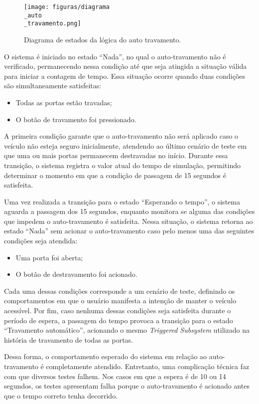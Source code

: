 \begin{figure}[H]
\centering
\texttt{[image: figuras/diagrama\\\_auto\\\_travamento.png]}
\caption{Diagrama de estados da lógica do auto travamento.}
\end{figure}

O sistema é iniciado no estado ``Nada'', no qual o auto-travamento não é verificado, permanecendo nessa condição até que seja atingida a situação válida para iniciar 
a contagem de tempo. Essa situação ocorre quando duas condições são simultaneamente satisfeitas:

\begin{itemize}
	\item Todas as portas estão travadas;
	\item O botão de travamento foi pressionado.
\end{itemize}

A primeira condição garante que o auto-travamento não será aplicado caso o veículo não esteja seguro inicialmente, atendendo ao último cenário de teste em que uma 
ou mais portas permanecem destravadas no início. Durante essa transição, o sistema registra o valor atual do tempo de simulação, permitindo determinar o momento em 
que a condição de passagem de 15 segundos é satisfeita.

Uma vez realizada a transição para o estado ``Esperando o tempo'', o sistema aguarda a passagem dos 15 segundos, enquanto monitora se alguma das condições que impedem 
o auto-travamento é satisfeita. Nessa situação, o sistema retorna ao estado ``Nada'' sem acionar o auto-travamento caso pelo menos uma das seguintes condições seja atendida:
\begin{itemize}
	\item Uma porta foi aberta;
	\item O botão de destravamento foi acionado.
\end{itemize}

Cada uma dessas condições corresponde a um cenário de teste, definindo os comportamentos em que o usuário manifesta a intenção de manter o veículo acessível. Por fim, 
caso nenhuma dessas condições seja satisfeita durante o período de espera, a passagem do tempo provoca a transição para o estado ``Travamento automático'', acionando 
o mesmo \textit{Triggered Subsystem} utilizado na história de travamento de todas as portas.

Dessa forma, o comportamento esperado do sistema em relação ao auto-travamento é completamente atendido. Entretanto, uma complicação técnica faz com que diversos 
testes falhem. Nos casos em que a espera é de 10 ou 14 segundos, os testes apresentam falha porque o auto-travamento é acionado antes que o tempo correto tenha decorrido.

